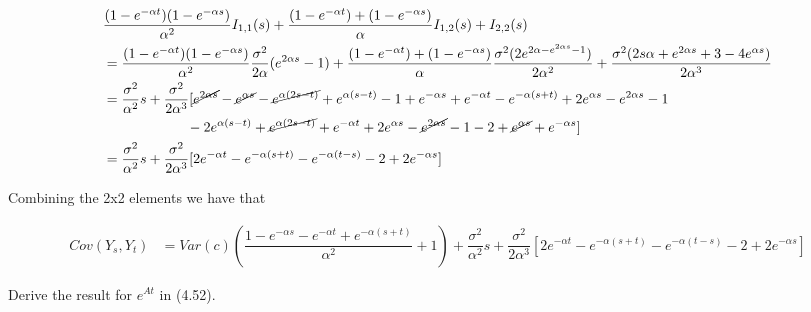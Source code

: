 \documentclass{article}
\numberwithin{questioncounter}{section}
\begin{document}
\begin{solution}
\begin{align*}
& \dfrac{(1 - e^{-\alpha t})(1 - e^{-\alpha s})}{\alpha^2} I_{1,1}(s) + \dfrac{(1 - e^{-\alpha t}) + (1 - e^{-\alpha s})}{\alpha} I_{1,2}(s) + I_{2,2}(s) \\
&= \dfrac{(1 - e^{-\alpha t})(1 - e^{-\alpha s})}{\alpha^2} \dfrac{\sigma^2}{2\alpha} (e^{2\alpha s} - 1) + \dfrac{(1 - e^{-\alpha t}) + (1 - e^{-\alpha s})}{\alpha} \dfrac{\sigma^{2} (2 e^{2\alpha - e^{2\alpha s} - 1})}{2\alpha^2} + \dfrac{\sigma^2(2s\alpha + e^{2\alpha s} + 3 - 4e^{\alpha s})}{2\alpha^3} \\
&= \dfrac{\sigma^2}{\alpha^2} s + \dfrac{\sigma^2}{2\alpha^3} [ \cancel{e^{2\alpha s}} - \cancel{e^{\alpha s}} - \cancel{e^{\alpha(2s - t)}} + e^{\alpha(s-t)} - 1 + e^{-\alpha s} + e^{-\alpha t} - e^{-\alpha(s+t)} + 2e^{\alpha s} - e^{2\alpha s} - 1 \\
& \qquad\qquad\qquad -2e^{\alpha(s-t)} + \cancel{e^{\alpha(2s-t)}} + e^{-\alpha t} + 2e^{\alpha s} - \cancel{e^{2\alpha s}} - 1 - 2 + \cancel{e^{\alpha s}} + e^{-\alpha s} ] \\
&= \dfrac{\sigma^2}{\alpha^2} s + \dfrac{\sigma^2}{2\alpha^3} [2e^{-\alpha t} - e^{-\alpha(s+t)} - e^{-\alpha(t-s)} - 2 + 2e^{-\alpha s}]
\end{align*}

Combining the 2x2 elements we have that

\begin{align*}
Cov(Y_{s}, Y_{t}) &= Var(c) \left(\dfrac{1 - e^{-\alpha s} - e^{-\alpha t} + e^{-\alpha (s+t)}}{\alpha^2} + 1\right) + \dfrac{\sigma^2}{\alpha^2} s + \dfrac{\sigma^2}{2\alpha^3} [2e^{-\alpha t} - e^{-\alpha(s+t)} - e^{-\alpha(t-s)} - 2 + 2e^{-\alpha s}]
\end{align*}

\end{solution}

\begin{question}
Derive the result for $e^{At}$ in (4.52).
\end{question}
\end{document}
